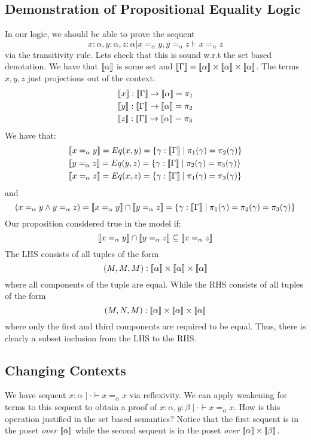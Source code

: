 \documentclass{article}
\begin{document}
\subsection{Demonstration of Propositional Equality Logic}
In our logic, we should be able to prove the sequent
\[
  x : \alpha, y : \alpha, z : \alpha | x =_{\alpha} y , y =_{\alpha} z \vdash x =_{\alpha} z  
\]
via the transitivity rule. Lets check that this is sound w.r.t the set based denotation.
We have that $\llbracket \alpha \rrbracket$ is some set and $\llbracket \Gamma \rrbracket = \llbracket \alpha \rrbracket \times \llbracket \alpha \rrbracket\times \llbracket \alpha \rrbracket$.
The terms $x,y,z$ just projections out of the context.
\begin{align*}
    &\llbracket x \rrbracket : \llbracket \Gamma \rrbracket \rightarrow \llbracket \alpha \rrbracket = \pi_1 \\
    &\llbracket y \rrbracket : \llbracket \Gamma \rrbracket \rightarrow \llbracket \alpha \rrbracket = \pi_2\\
    &\llbracket z \rrbracket : \llbracket \Gamma \rrbracket \rightarrow \llbracket \alpha \rrbracket = \pi_3 \\
\end{align*}
We have that:
\begin{align*}
    &\llbracket x =_{\alpha} y \rrbracket = Eq(x,y) = \{\gamma : \llbracket \Gamma \rrbracket \;|\; \pi_1(\gamma) = \pi_2(\gamma)\}\\
    &\llbracket y =_{\alpha} z \rrbracket = Eq(y,z) = \{\gamma : \llbracket \Gamma \rrbracket \;|\; \pi_2(\gamma) = \pi_3(\gamma)\}\\
    &\llbracket x =_{\alpha} z \rrbracket = Eq(x,z) = \{\gamma : \llbracket \Gamma \rrbracket \;|\; \pi_1(\gamma) = \pi_3(\gamma)\}\\
\end{align*}
and 
\[
    (x =_{\alpha} y \land y =_{\alpha} z) = \llbracket x =_{\alpha} y \rrbracket \cap \llbracket y =_{\alpha} z \rrbracket = \{ \gamma : \llbracket \Gamma \rrbracket \; | \; \pi_1(\gamma) = \pi_2(\gamma) = \pi_3(\gamma)\}
\]
Our proposition considered true in the model if:
\[
    \llbracket x =_{\alpha} y \rrbracket \cap \llbracket y =_{\alpha} z \rrbracket \subseteq \llbracket x =_{\alpha} z \rrbracket 
\]
The LHS consists of all tuples of the form 
\[
    (M , M, M) : \llbracket \alpha \rrbracket \times \llbracket \alpha \rrbracket\times \llbracket \alpha \rrbracket
\]  
where all components of the tuple are equal. While the RHS consists of all tuples of the form
\[
    (M , N, M) : \llbracket \alpha \rrbracket \times \llbracket \alpha \rrbracket\times \llbracket \alpha \rrbracket
\]
where only the first and third components are required to be equal. 
Thus, there is clearly a subset inclusion from the LHS to the RHS. 

\subsection{Changing Contexts}
We have sequent $x : \alpha \;|\; \cdot \vdash x =_{\alpha} x $ via reflexivity. 
We can apply weakening for terms to this sequent to obtain a proof of 
$x : \alpha, y : \beta \;|\; \cdot \vdash x =_{\alpha} x $. 
How is this operation justified in the set based semantics? 
Notice that the first sequent is in the poset \textit{over} $\llbracket \alpha \rrbracket$ 
while the second sequent is in the poset \textit{over} $\llbracket \alpha \rrbracket \times \llbracket \beta \rrbracket$.
\end{document}
